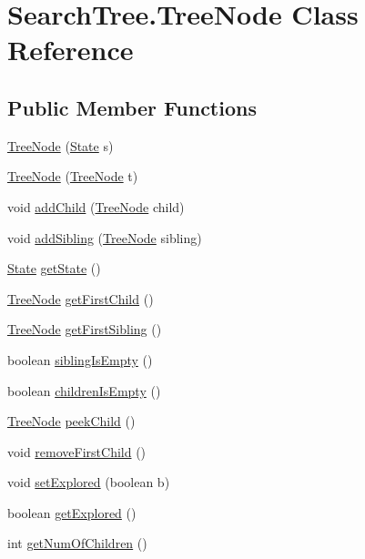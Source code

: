 \hypertarget{class_search_tree_1_1_tree_node}{\section{Search\+Tree.\+Tree\+Node Class Reference}
\label{class_search_tree_1_1_tree_node}
}
\subsection*{Public Member Functions}
\begin{DoxyCompactItemize}
\item 
\hyperlink{class_search_tree_1_1_tree_node_a5d261d0c6f6d93bf157d9899f1c9ecf7}{Tree\+Node} (\hyperlink{classcsm6120__assignment2_1_1_state}{State} s)
\item 
\hyperlink{class_search_tree_1_1_tree_node_a41f1a0d897ff34181dce33e513a2d804}{Tree\+Node} (\hyperlink{class_search_tree_1_1_tree_node}{Tree\+Node} t)
\item 
void \hyperlink{class_search_tree_1_1_tree_node_ad93c9da8ec6858c0c85050ad9bcf5108}{add\+Child} (\hyperlink{class_search_tree_1_1_tree_node}{Tree\+Node} child)
\item 
void \hyperlink{class_search_tree_1_1_tree_node_a389273ba4be929c11a59d15a002c40d8}{add\+Sibling} (\hyperlink{class_search_tree_1_1_tree_node}{Tree\+Node} sibling)
\item 
\hyperlink{classcsm6120__assignment2_1_1_state}{State} \hyperlink{class_search_tree_1_1_tree_node_a7d27acf186463a6f37ba79ef6113ac2b}{get\+State} ()
\item 
\hyperlink{class_search_tree_1_1_tree_node}{Tree\+Node} \hyperlink{class_search_tree_1_1_tree_node_a0dbf791b9a6414df552c9d755b8b32e1}{get\+First\+Child} ()
\item 
\hyperlink{class_search_tree_1_1_tree_node}{Tree\+Node} \hyperlink{class_search_tree_1_1_tree_node_aa56b889e12a04010229dbf3b54f64819}{get\+First\+Sibling} ()
\item 
boolean \hyperlink{class_search_tree_1_1_tree_node_ad5ff235899e70e21360b83724f8eb7bb}{sibling\+Is\+Empty} ()
\item 
boolean \hyperlink{class_search_tree_1_1_tree_node_a6bb5952ae4681cd9dfd9394941c33ca5}{children\+Is\+Empty} ()
\item 
\hyperlink{class_search_tree_1_1_tree_node}{Tree\+Node} \hyperlink{class_search_tree_1_1_tree_node_a2caf73bb2c6b407fb761621a59c377e2}{peek\+Child} ()
\item 
void \hyperlink{class_search_tree_1_1_tree_node_a45ea86f7ce71e5e7dcea4426a60ef50c}{remove\+First\+Child} ()
\item 
void \hyperlink{class_search_tree_1_1_tree_node_a67ed4d08a604bf2eef93f06b9547d074}{set\+Explored} (boolean b)
\item 
boolean \hyperlink{class_search_tree_1_1_tree_node_ac1a618b9ff9fdfe1a12ca29f2a570d07}{get\+Explored} ()
\item 
int \hyperlink{class_search_tree_1_1_tree_node_a52bda51536e0c892cb8d726fb4069037}{get\+Num\+Of\+Children} ()
\end{DoxyCompactItemize}


